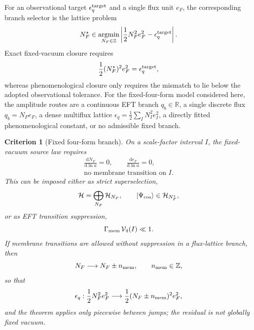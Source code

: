 \documentclass[
  aps,
  prd,
  reprint,
  superscriptaddress,
  floatfix,
  nofootinbib,
  longbibliography
]{revtex4-2}
\theoremstyle{plain}
\newtheorem{criterion}[theorem]{Criterion}
\theoremstyle{definition}
\theoremstyle{remark}
\newcommand{\dd}{\mathrm d}
\newcommand{\Z}{\mathbb Z}
\newcommand{\R}{\mathbb R}
\newcommand{\eps}{\epsilon}
\newcommand{\NF}{N_F}
\newcommand{\eF}{e_F}
\begin{document}
For an observational target $\eps_q^{\rm target}$ and a single flux unit $\eF$,
the corresponding branch selector is the lattice problem
\begin{equation}
\NF^\star\in
\operatorname*{argmin}_{\NF\in\Z}
\left|\frac{1}{2}\NF^2\eF^2-\eps_q^{\rm target}\right| .
\end{equation}
Exact fixed-vacuum closure requires
\begin{equation}
\frac{1}{2}(\NF^\star)^2\eF^2=\eps_q^{\rm target},
\end{equation}
whereas phenomenological closure only requires the mismatch to lie below the
adopted observational tolerance.  For the fixed-four-form model considered
here, the amplitude routes are a continuous EFT branch $q_b\in\R$, a single
discrete flux $q_b=\NF\eF$, a dense multiflux lattice
$\eps_q=\frac{1}{2}\sum_I N_I^2e_I^2$, a directly fitted phenomenological
constant, or no admissible fixed branch.


\begin{criterion}[Fixed four-form branch]
On a scale-factor interval \(I\), the fixed-vacuum source law requires
\begin{equation}
\begin{gathered}
\frac{\dd \NF}{\dd\ln a}=0,
\qquad
\frac{\dd \eF}{\dd\ln a}=0,\\
\text{no membrane transition on }I .
\end{gathered}
\label{eq:fixed_branch_v13}
\end{equation}
This can be imposed either as strict superselection,
\begin{equation}
\mathcal H=\bigoplus_{\NF}\mathcal H_{\NF},
\qquad
|\Psi_{\rm cos}\rangle\in\mathcal H_{\NF^\star},
\end{equation}
or as EFT transition suppression,
\begin{equation}
\Gamma_{\rm mem}\,\mathcal V_4(I)\ll1 .
\end{equation}
If membrane transitions are allowed without suppression in a flux-lattice
branch, then
\begin{equation}
\NF\longrightarrow \NF\pm n_{\rm mem},
\qquad n_{\rm mem}\in\Z,
\end{equation}
so that
\begin{equation}
\eps_q:\frac{1}{2}\NF^2\eF^2
\longrightarrow
\frac{1}{2}(\NF\pm n_{\rm mem})^2\eF^2,
\end{equation}
and the theorem applies only piecewise between jumps; the residual is not
globally fixed vacuum.
\end{criterion}
\end{document}
